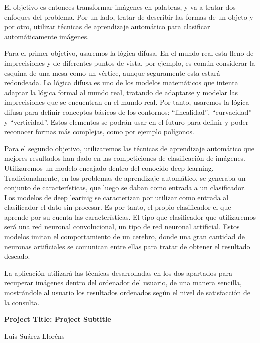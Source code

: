 El objetivo es entonces transformar imágenes en palabras, y va a tratar dos enfoques del problema. Por un lado, tratar de describir las formas de un objeto y por otro, utilizar técnicas de aprendizaje automático para clasificar automáticamente imágenes.


Para el primer objetivo, usaremos la lógica difusa. En el mundo real esta lleno de imprecisiones y de diferentes puntos de vista. por ejemplo, es común considerar la esquina de una mesa como un vértice, aunque seguramente esta estará redondeada. La lógica difusa es uno de los modelos matemáticos que intenta adaptar la lógica formal al mundo real, tratando de adaptarse y modelar las imprecisiones que se encuentran en el mundo real. Por tanto, usaremos la lógica difusa para definir conceptos básicos de los contornos: ``linealidad'', ``curvacidad'' y ``verticidad''. Estos elementos se podrán usar en el futuro para definir y poder reconocer formas más complejas, como por ejemplo polígonos.  

Para el segundo objetivo, utilizaremos las técnicas de aprendizaje automático que mejores resultados han dado en las competiciones de clasificación de imágenes. Utilizaremos un modelo encajado dentro del conocido deep learning. Tradicionalmente, en los problemas de aprendizaje automático, se generaba un conjunto de características, que luego se daban como entrada a un clasificador. Los modelos de deep learinig se caracterizan por utilizar como entrada al clasificador el dato sin procesar. Es por tanto, el propio clasificador el que aprende por su cuenta las características. El tipo que clasificador que utilizaremos será una red neuronal convolucional, un tipo de red neuronal artificial. Estos modelos imitan el comportamiento de un cerebro, donde una gran cantidad de neuronas artificiales se comunican entre ellas para tratar de obtener el resultado  deseado.

La aplicación utilizará las técnicas desarrolladas en los dos apartados para recuperar imágenes dentro del ordenador del usuario, de una manera sencilla, mostrándole al usuario los resultados ordenados según el nivel de satisfacción de la consulta.
 
\cleardoublepage


\thispagestyle{empty}

\begin{center}
{\large\bfseries Project Title: Project Subtitle}\\
\end{center}
\begin{center}
Luis Suárez Lloréns\\
\end{center}


